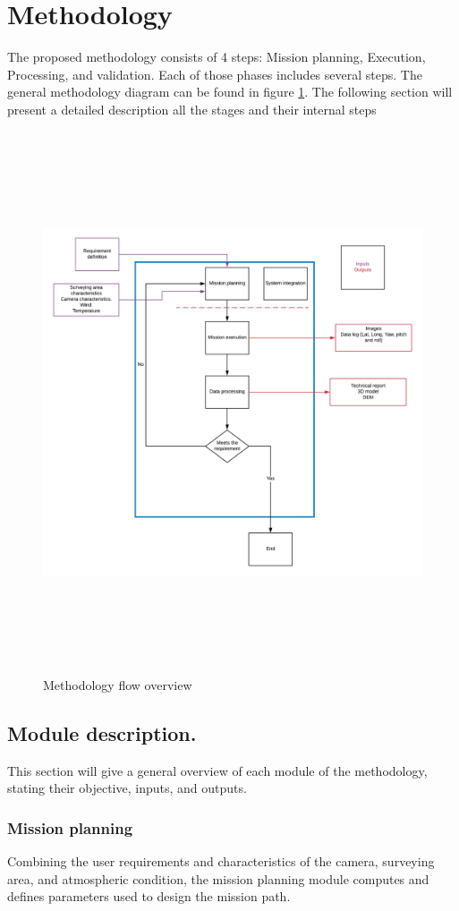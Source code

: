 \section{Methodology}
The proposed methodology consists of 4 steps: Mission planning, Execution, Processing, and validation. Each of those phases includes several steps. The general methodology diagram can be found in figure \ref{fig:methodology_Flow}.
The following section will present a detailed description all the stages and their internal steps
\begin{figure}[H]
\centering
\includegraphics[width=16cm,height=16cm,keepaspectratio]{imagenes/Methodology.png}
\caption{Methodology flow overview}
\label{fig:methodology_Flow}
\end{figure}
\subsection{Module description.}
This section will give a general overview of each module of the methodology, stating their objective, inputs, and outputs.

\subsubsection{Mission planning}
Combining the user requirements and characteristics of the camera, surveying area, and atmospheric condition, the mission planning module computes and defines parameters used to design the mission path.


